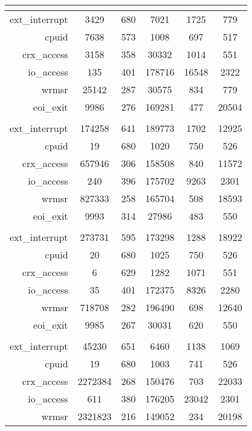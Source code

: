 \begin{longtable}{|r|c|c|c|c|c|}
	\multicolumn{6}{|c|}{\textbf{\mcachepressure{}}} \\ \hline
       ext\_interrupt	& 3429	& 680	& 7021	& 1725	& 779  \\
               cpuid	& 7638	& 573	& 1008	& 697	& 517  \\
          crx\_access	& 3158	& 358	& 30332	& 1014	& 551  \\
           io\_access	& 135	& 401	& 178716 & 16548 & 2322  \\
               wrmsr	& 25142	& 287	& 30575	& 834	& 779   \\ 
            eoi\_exit	& 9986	& 276	& 169281 & 477	& 20504  \\ \hline
	\multicolumn{6}{|c|}{\textbf{\mforkops{}}} \\ \hline
       ext\_interrupt	& 174258	& 641	& 189773	& 1702	& 12925 \\
               cpuid	& 19	& 680	& 1020	& 750	& 526 \\
          crx\_access	& 657946	& 306	& 158508	& 840	& 11572 \\
           io\_access	& 240	& 396	& 175702	& 9263	& 2301 \\
               wrmsr	& 827333	& 258	& 165704	& 508	& 18593 \\
            eoi\_exit	& 9993	& 314	& 27986	& 483	& 550 \\ \hline
	\multicolumn{6}{|c|}{\textbf{\mfileops{}}} \\ \hline
	  ext\_interrupt	& 273731	& 595	& 173298	& 1288	& 18922 \\
               cpuid	& 20	& 680	& 1025	& 750	& 526 \\
          crx\_access	& 6	& 629	& 1282	& 1071	& 551 \\
           io\_access	& 35	& 401	& 172375	& 8326	& 2280 \\
               wrmsr	& 718708	& 282	& 196490	& 698	& 12640 \\
            eoi\_exit	& 9985	& 267	& 30031	& 620	& 550 \\ \hline
	\multicolumn{6}{|c|}{\textbf{\mhackbench{}}} \\ \hline
       ext\_interrupt	& 45230	& 651	& 6460	& 1138	& 1069 \\
               cpuid	& 19	& 680	& 1003	& 741	& 526 \\ 
          crx\_access	& 2272384	& 268	& 150476	& 703	& 22033 \\ 
           io\_access	& 611	& 380	& 176205	& 23042	& 2301 \\
               wrmsr	& 2321823	& 216	& 149052	& 234	& 20198 \\

\end{longtable}
